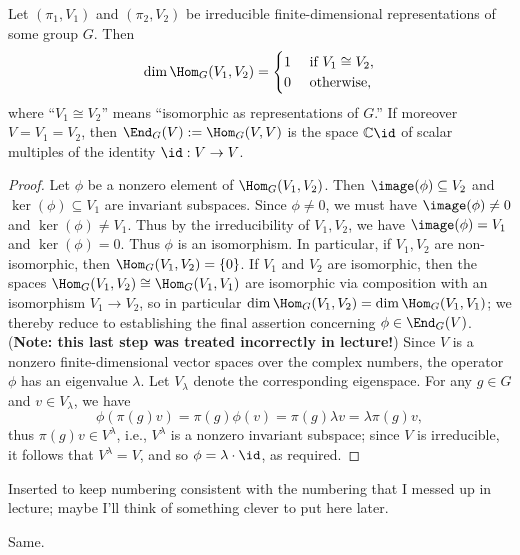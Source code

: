 \documentclass[reqno]{amsart} 
\begin{document}
\begin{theorem}
  Let $(\pi_1, V_1)$ and $(\pi_2, V_2)$ be irreducible finite-dimensional representations of some group $G$.  Then
  \begin{equation*}
    \dim \Hom_G (V_1, V_2) = 
    \begin{cases}
      1 & \text{ if } V_1 \cong V_2, \\
      0 & \text{ otherwise},
    \end{cases}
  \end{equation*}
  where ``$V_1 \cong V_2$'' means ``isomorphic as representations of $G$.''  If moreover $V = V_1 = V_2$, then $\End_G(V) := \Hom_G(V,V)$ is the space $\mathbb{C} \id$ of scalar multiples of the identity $\id : V \rightarrow V$.
\end{theorem}
\begin{proof}
  Let $\phi$ be a nonzero element of $\Hom_G(V_1,V_2)$.  Then $\image(\phi) \subseteq V_2$ and $\ker(\phi) \subseteq V_1$ are invariant subspaces.  Since $\phi \neq 0$, we must have $\image(\phi) \neq 0$ and $\ker(\phi) \neq V_1$.  Thus by the irreducibility of $V_1, V_2$, we have $\image(\phi) = V_1$ and $\ker(\phi) = 0$.  Thus $\phi$ is an isomorphism.  In particular, if $V_1, V_2$ are non-isomorphic, then $\Hom_G(V_1,V_2) = \{0\}$.  If $V_1$ and $V_2$ are isomorphic, then the spaces $\Hom_G (V_1, V_2) \cong \Hom_G(V_1,V_1)$ are isomorphic via composition with an isomorphism $V_1 \rightarrow V_2$, so in particular $\dim \Hom_G (V_1, V_2) = \dim \Hom_G(V_1,V_1)$; we thereby reduce to establishing the final assertion concerning $\phi \in \End_G(V)$.  ({\bf Note: this last step was treated incorrectly in lecture!})  Since $V$ is a nonzero finite-dimensional vector spaces over the complex numbers, the operator $\phi$ has an eigenvalue $\lambda$.  Let $V_\lambda$ denote the corresponding eigenspace.  For any $g \in G$ and $v \in V_\lambda$, we have
  \begin{equation}
    \phi(\pi(g) v)
    =
    \pi(g) \phi(v)
    = \pi(g) \lambda v
    = \lambda \pi(g) v,
  \end{equation}
  thus $\pi(g) v \in V^\lambda$, i.e., $V^\lambda$ is a nonzero invariant subspace; since $V$ is irreducible, it follows that $V^\lambda = V$, and so $\phi = \lambda \cdot \id$, as required.
\end{proof}

\begin{remark}
  Inserted to keep numbering consistent with the numbering that I messed up in lecture; maybe I'll think of something clever to put here later.
\end{remark}
\begin{remark}
  Same.
\end{remark}
\end{document}
